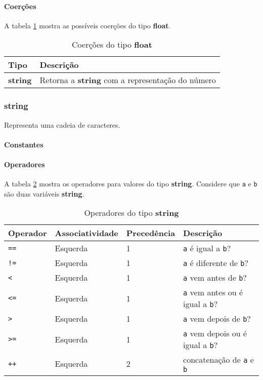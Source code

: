 \paragraph{Coerções} A tabela \ref{tab:coercoes-float} mostra as possíveis coerções do tipo \textbf{float}.
\begin{table}[!h]
    \begin{tabular}{@{}ll@{}}
        \toprule
        Tipo            & Descrição                                               \\ \midrule
        \textbf{string} & Retorna a \textbf{string} com a representação do número \\ \bottomrule
    \end{tabular}
    \caption{Coerções do tipo \textbf{float}}
    \label{tab:coercoes-float}
\end{table}

\subsubsection{string}
Representa uma cadeia de caracteres.

\paragraph{Constantes}

\paragraph{Operadores} A tabela \ref{tab:operadores-string} mostra os operadores para valores do tipo \textbf{string}. Considere que \texttt{a} e \texttt{b} são duas variáveis \textbf{string}.
\begin{table}[!h]
    \begin{tabular}{@{}llll@{}}
        \toprule
        Operador                 & Associatividade & Precedência & Descrição                                      \\ \midrule
        \texttt{==}              & Esquerda        & 1           & \texttt{a} é igual a \texttt{b}?               \\
        \texttt{!=}              & Esquerda        & 1           & \texttt{a} é diferente de \texttt{b}?          \\
        \texttt{\textless{}}     & Esquerda        & 1           & \texttt{a} vem antes de \texttt{b}?            \\
        \texttt{\textless{}=}    & Esquerda        & 1           & \texttt{a} vem antes ou é igual a \texttt{b}?  \\
        \texttt{\textgreater{}}  & Esquerda        & 1           & \texttt{a} vem depois de \texttt{b}?           \\
        \texttt{\textgreater{}=} & Esquerda        & 1           & \texttt{a} vem depois ou é igual a \texttt{b}? \\
        \texttt{++}              & Esquerda        & 2           & concatenação de \texttt{a} e \texttt{b}        \\
    \end{tabular}
    \caption{Operadores do tipo \textbf{string}}
    \label{tab:operadores-string}
\end{table}

